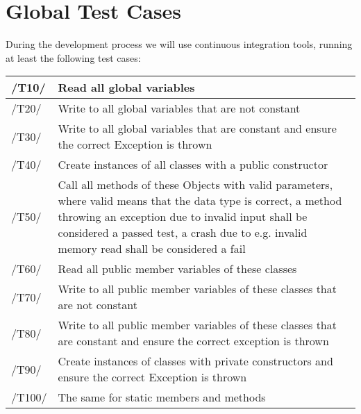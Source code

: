 \chapter{Global Test Cases}
During the development process we will use continuous integration tools, running at least the following test cases: \\

\begin{longtable}{|p{1cm} | p{15cm}|}
  \hline
  /T10/ & Read all global variables \\
  \hline
  /T20/ & Write to all global variables that are not constant \\
  \hline
  /T30/ & Write to all global variables that are constant and ensure the correct Exception is thrown \\
  \hline
  /T40/ & Create instances of all classes with a public constructor \\
  \hline
  /T50/ & Call all methods of these Objects with valid parameters, where valid means that the 	data type is correct, a method throwing an exception due to invalid input shall be considered a passed test, a crash due to e.g. invalid memory read shall be considered a fail \\
  \hline
  /T60/ & Read all public member variables of these classes \\
  \hline
  /T70/ & Write to all public member variables of these classes that are not constant \\
  \hline
  /T80/ & Write to all public member variables of these classes that are constant and ensure the correct exception is thrown \\
  \hline
  /T90/ & Create instances of classes with private constructors and ensure the correct Exception is thrown \\
  \hline
  /T100/ &  The same for static members and methods \\
   \hline
\end{longtable}

